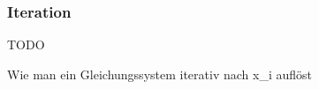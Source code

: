 %
%
%
\begin{frame}
\frametitle{Iteration}

TODO

Wie man ein Gleichungssystem iterativ nach x_i auflöst

\end{frame}
